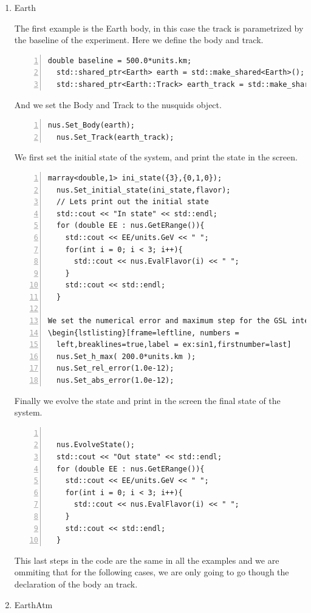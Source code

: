 \begin{enumerate}
\item {\ttf Earth}

The first example is the {\ttf Earth} body, in this case the track is
parametrized by the baseline of the experiment. Here we define the
body and track.
\begin{lstlisting}[frame=leftline, numbers =
  left,breaklines=true,label = ex:sin1,firstnumber=last]
  double baseline = 500.0*units.km;
  std::shared_ptr<Earth> earth = std::make_shared<Earth>();
  std::shared_ptr<Earth::Track> earth_track = std::make_shared<Earth::Track>(0.0,baseline,baseline);
\end{lstlisting}
And we set the Body and Track to the nusquids object.
\begin{lstlisting}[frame=leftline, numbers =
  left,breaklines=true,label = ex:sin1,firstnumber=last]
  nus.Set_Body(earth);
  nus.Set_Track(earth_track);
\end{lstlisting}

We first set the initial state of the system, and print the state in
the screen.
\begin{lstlisting}[frame=leftline, numbers =
  left,breaklines=true,label = ex:sin1,firstnumber=last]
  marray<double,1> ini_state({3},{0,1,0});
  nus.Set_initial_state(ini_state,flavor);
  // Lets print out the initial state
  std::cout << "In state" << std::endl;
  for (double EE : nus.GetERange()){
    std::cout << EE/units.GeV << " ";
    for(int i = 0; i < 3; i++){
      std::cout << nus.EvalFlavor(i) << " ";
    }
    std::cout << std::endl;
  }

We set the numerical error and maximum step for the GSL integrator.
\begin{lstlisting}[frame=leftline, numbers =
  left,breaklines=true,label = ex:sin1,firstnumber=last]
  nus.Set_h_max( 200.0*units.km );
  nus.Set_rel_error(1.0e-12);
  nus.Set_abs_error(1.0e-12);
\end{lstlisting}

Finally we evolve the state and print in the screen the final state of
the system.
\begin{lstlisting}[frame=leftline, numbers =
  left,breaklines=true,label = ex:sin1,firstnumber=last]

  nus.EvolveState();
  std::cout << "Out state" << std::endl;
  for (double EE : nus.GetERange()){
    std::cout << EE/units.GeV << " ";
    for(int i = 0; i < 3; i++){
      std::cout << nus.EvalFlavor(i) << " ";
    }
    std::cout << std::endl;
  }
\end{lstlisting}
This last steps in the code are the same in all the examples and we
are ommiting that for the following cases, we are only going to go though the
declaration of the body an track. 
\item {\ttf EarthAtm}


\end{enumerate}

